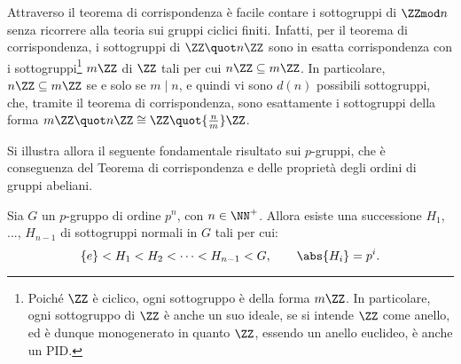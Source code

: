 \documentclass[12pt]{scrartcl}
\begin{document}
	
	\begin{example}
		Attraverso il teorema di corrispondenza è facile
		contare i sottogruppi di $\ZZmod n$ senza ricorrere
		alla teoria sui gruppi ciclici finiti. Infatti, per
		il teorema di corrispondenza, i sottogruppi di
		$\ZZ \quot n \ZZ$ sono in esatta corrispondenza
		con i sottogruppi\footnote{
			Poiché $\ZZ$ è ciclico, ogni sottogruppo è
			della forma $m \ZZ$. In particolare, ogni sottogruppo
			di $\ZZ$ è anche un suo ideale, se si intende
			$\ZZ$ come anello, ed è dunque monogenerato in
			quanto $\ZZ$, essendo un anello euclideo, è
			anche un PID.
		} $m\ZZ$ di $\ZZ$ tali per cui $n \ZZ \subseteq m \ZZ$.
		In particolare, $n \ZZ \subseteq m \ZZ$ se e solo se
		$m \mid n$, e quindi vi sono $d(n)$ possibili sottogruppi, che, tramite il teorema di corrispondenza, sono esattamente
		i sottogruppi della forma $m\ZZ \quot n\ZZ \cong \ZZ \quot{\frac{n}{m}} \ZZ$.
	\end{example}
	\bigskip
	
	
	Si illustra allora il seguente fondamentale risultato sui $p$-gruppi,
	che è conseguenza del Teorema di corrispondenza e delle proprietà degli
	ordini di gruppi abeliani.
	
	\begin{proposition}
		Sia $G$ un $p$-gruppo di ordine $p^n$, con $n \in \NN^+$. Allora
		esiste una successione $H_1$, ..., $H_{n-1}$ di sottogruppi normali in $G$
		tali per cui:
		\[ \{ e \} < H_1 < H_2 < \cdots < H_{n-1} < G, \qquad \abs{H_i} = p^i. \]
	\end{proposition}
	
\end{document}
